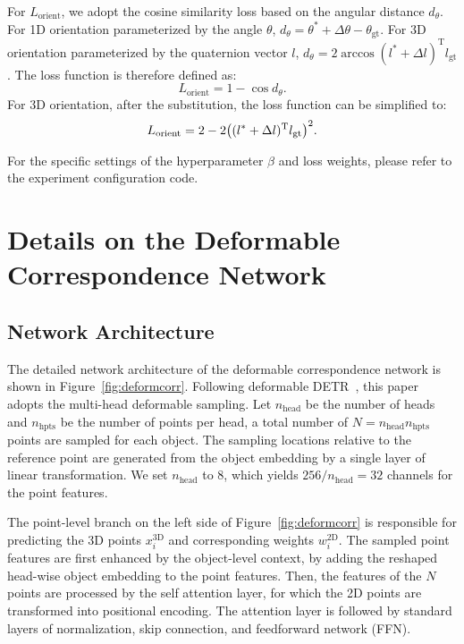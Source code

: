 \documentclass[10pt,twocolumn,letterpaper]{article}
\let\originalleft\left
\let\originalright\right
\renewcommand{\left}{\mathopen{}\mathclose\bgroup\originalleft}
\renewcommand{\right}{\aftergroup\egroup\originalright}
\begin{document}
For $L_\text{orient}$, we adopt the cosine similarity loss based on the angular distance $d_\theta$. For 1D orientation parameterized by the angle $\theta$, $d_\theta = \theta^\ast + \Delta \theta - \theta_\text{gt}$. For 3D orientation parameterized by the quaternion vector $l$, $d_\theta = 2 \arccos{(l^\ast + \Delta l)^\text{T} l_\text{gt}}$. The loss function is therefore defined as:
\begin{equation}
    L_\text{orient} = 1 - \cos{d_\theta}.
    \label{orientloss}
\end{equation}
For 3D orientation, after the substitution, the loss function can be simplified to:
\begin{equation}
    L_\text{orient} = 2 - 2 \left( (l^\ast + \Delta l)^\text{T} l_\text{gt} \right)^2.
\end{equation}

For the specific settings of the hyperparameter $\beta$ and loss weights, please refer to the experiment configuration code.

\section{Details on the Deformable Correspondence Network}

\subsection{Network Architecture} \label{deformnetsup}
The detailed network architecture of the deformable correspondence network is shown in Figure~\ref{fig:deformcorr}.
Following deformable DETR~\cite{deformabledetr}, this paper adopts the multi-head deformable sampling. Let $n_\text{head}$ be the number of heads and $n_\text{hpts}$ be the number of points per head, a total number of $N = n_\text{head} n_\text{hpts}$ points are sampled for each object. The sampling locations relative to the reference point are generated from the object embedding by a single layer of linear transformation. We set $n_\text{head}$ to 8, which yields $256 / n_\text{head} = 32$ channels for the point features.

The point-level branch on the left side of Figure~\ref{fig:deformcorr} is responsible for predicting the 3D points $x^\text{3D}_i$ and corresponding weights $w^\text{2D}_i$. The sampled point features are first enhanced by the object-level context, by adding the reshaped head-wise object embedding to the point features. Then, the features of the $N$ points are processed by the self attention layer, for which the 2D points are transformed into positional encoding. The attention layer is followed by standard layers of normalization, skip connection, and feedforward network (FFN).
\end{document}

